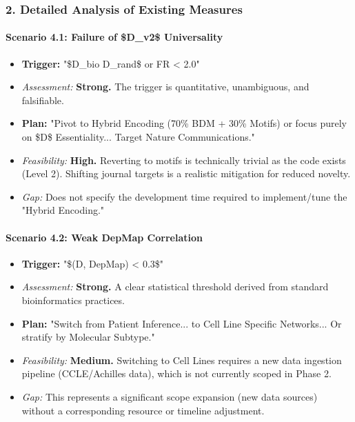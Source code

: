 \documentclass{article}
\begin{document}
\subsubsection{2. Detailed Analysis of Existing Measures}

\paragraph{Scenario 4.1: Failure of \$D\_{v2}\$ Universality}
\begin{itemize}
\item   \textbf{Trigger:} "\$D\_{bio} \approx D\_{rand}\$ or FR < 2.0"
\item   \textit{Assessment:} \textbf{Strong.} The trigger is quantitative, unambiguous, and falsifiable.
\item   \textbf{Plan:} "Pivot to Hybrid Encoding (70\% BDM + 30\% Motifs) or focus purely on \$\Delta D\$ Essentiality... Target Nature Communications."
\item   \textit{Feasibility:} \textbf{High.} Reverting to motifs is technically trivial as the code exists (Level 2). Shifting journal targets is a realistic mitigation for reduced novelty.
\item   \textit{Gap:} Does not specify the development time required to implement/tune the "Hybrid Encoding."
\end{itemize}

\paragraph{Scenario 4.2: Weak DepMap Correlation}
\begin{itemize}
\item   \textbf{Trigger:} "\$\rho(\Delta D, DepMap) < 0.3\$"
\item   \textit{Assessment:} \textbf{Strong.} A clear statistical threshold derived from standard bioinformatics practices.
\item   \textbf{Plan:} "Switch from Patient Inference... to Cell Line Specific Networks... Or stratify by Molecular Subtype."
\item   \textit{Feasibility:} \textbf{Medium.} Switching to Cell Lines requires a new data ingestion pipeline (CCLE/Achilles data), which is not currently scoped in Phase 2.
\item   \textit{Gap:} This represents a significant scope expansion (new data sources) without a corresponding resource or timeline adjustment.
\end{itemize}
\end{document}
